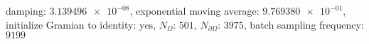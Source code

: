 damping: $\num[scientific-notation=true]{3.139496e-08}$, exponential moving average: $\num[scientific-notation=true]{9.769380e-01}$, initialize Gramian to identity: $\text{yes}$, $N_{\Omega}$: $\num[scientific-notation=false]{501}$, $N_{\partial\Omega}$: $\num[scientific-notation=false]{3975}$, batch sampling frequency: $\num[scientific-notation=false]{9199}$